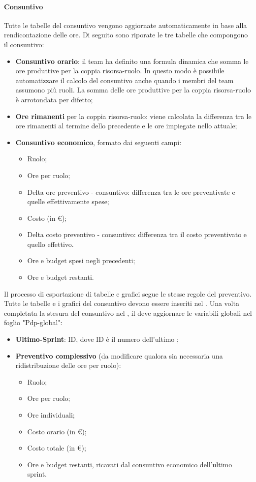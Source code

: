 \paragraph*{Consuntivo}
Tutte le tabelle del consuntivo vengono aggiornate automaticamente in base alla rendicontazione delle ore. Di seguito sono riporate le tre tabelle che compongono il consuntivo:
\begin{itemize}
  \item \textbf{Consuntivo orario}: il team ha definito una formula dinamica che somma le ore produttive per la coppia risorsa-ruolo. In questo modo è possibile automatizzare il calcolo del consuntivo anche quando i membri del team assumono più ruoli. La somma delle ore produttive per la coppia risorsa-ruolo è arrotondata per difetto;
  \item \textbf{Ore rimanenti} per la coppia risorsa-ruolo: viene calcolata la differenza tra le ore rimanenti al termine dello  precedente e le ore impiegate nello  attuale;
  \item \textbf{Consuntivo economico}, formato dai seguenti campi:
  \begin{itemize}
    \item Ruolo;
    \item Ore per ruolo;
    \item Delta ore preventivo - consuntivo: differenza tra le ore preventivate e quelle effettivamente spese;
    \item Costo (in €);
    \item Delta costo preventivo - consuntivo: differenza tra il costo preventivato e quello effettivo.
    \item Ore e budget spesi negli  precedenti;
    \item Ore e budget restanti.
  \end{itemize}
\end{itemize}
\par Il processo di esportazione di tabelle e grafici segue le stesse regole del preventivo. Tutte le tabelle e i grafici del consuntivo devono essere inseriti nel \PdP. Una volta completata la stesura del consuntivo nel \PdP, il \Responsabile{} deve aggiornare le variabili globali nel foglio "Pdp-global":
\begin{itemize}
  \item \textbf{Ultimo-Sprint}: ID, dove ID è il numero dell'ultimo ;
  \item \textbf{Preventivo complessivo} (da modificare qualora sia necessaria una ridistribuzione delle ore per ruolo):
  \begin{itemize}
    \item Ruolo;
    \item Ore per ruolo;
    \item Ore individuali;
    \item Costo orario (in €);
    \item Costo totale (in €);
    \item Ore e budget restanti, ricavati dal consuntivo economico dell'ultimo sprint.
  \end{itemize}
\end{itemize}
